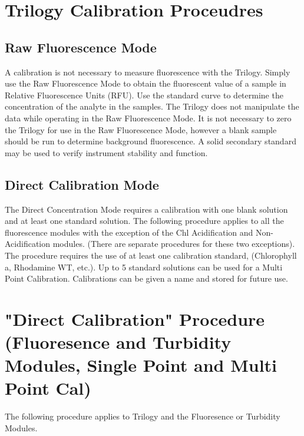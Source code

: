 \documentclass[12pt]{../SOP3_beta}\usepackage[]{graphicx}\usepackage[]{color}
\begin{document}
\section{Trilogy Calibration Proceudres}
\subsection{Raw Fluorescence Mode}
\NP A calibration is not necessary to measure fluorescence with the Trilogy. Simply use the Raw Fluorescence Mode to obtain the fluorescent value of a sample in Relative Fluorescence Units (RFU). Use the standard curve to determine the concentration of the analyte in the samples. The Trilogy does not manipulate the data while operating in the Raw Fluorescence Mode. It is not necessary to zero the Trilogy for use in the Raw Fluorescence Mode, however a blank sample should be run to determine background fluorescence. A solid secondary standard may be used to verify instrument stability and function. 

\subsection{Direct Calibration Mode}
\NP The Direct Concentration Mode requires a calibration with one blank solution and at least one standard solution. The following procedure applies to all the fluorescence modules with the exception of the Chl Acidification and Non-Acidification modules. (There are separate procedures for these two exceptions). The procedure requires the use of at least one calibration standard, (Chlorophyll a, Rhodamine WT, etc.). Up to 5 standard solutions can be used for a Multi Point Calibration. Calibrations can be given a name and stored for future use. 

\section{"Direct Calibration" Procedure (Fluoresence and Turbidity Modules, Single Point and Multi Point Cal)}
\NP The following procedure applies to Trilogy and the Fluoresence or Turbidity Modules.
\end{document}
